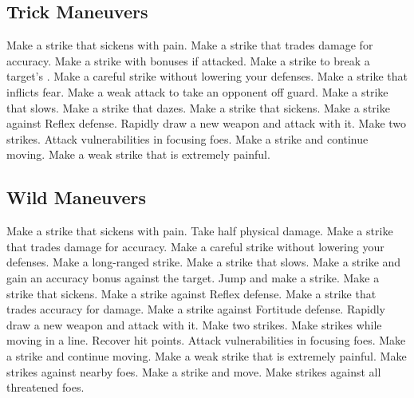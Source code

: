 \subsection{Trick Maneuvers}\label{Trick Maneuvers}
\begin{spelllist}
 Make a strike that sickens with pain.
 Make a strike that trades damage for accuracy.
 Make a strike with bonuses if attacked.
 Make a strike to break a target's .
 Make a careful strike without lowering your defenses.
 Make a strike that inflicts fear.
 Make a weak attack to take an opponent off guard.
 Make a strike that slows.
 Make a strike that dazes.
 Make a strike that sickens.
 Make a strike against Reflex defense.
 Rapidly draw a new weapon and attack with it.
 Make two strikes.
 Attack vulnerabilities in focusing foes.
 Make a strike and continue moving.
 Make a weak strike that is extremely painful.
\end{spelllist}



\small
\subsection{Wild Maneuvers}\label{Wild Maneuvers}
\begin{spelllist}
 Make a strike that sickens with pain.
 Take half physical damage.
 Make a strike that trades damage for accuracy.
 Make a careful strike without lowering your defenses.
 Make a long-ranged strike.
 Make a strike that slows.
 Make a strike and gain an accuracy bonus against the target.
 Jump and make a strike.
 Make a strike that sickens.
 Make a strike against Reflex defense.
 Make a strike that trades accuracy for damage.
 Make a strike against Fortitude defense.
 Rapidly draw a new weapon and attack with it.
 Make two strikes.
 Make strikes while moving in a line.
 Recover hit points.
 Attack vulnerabilities in focusing foes.
 Make a strike and continue moving.
 Make a weak strike that is extremely painful.
 Make strikes against nearby foes.
 Make a strike and move.
 Make strikes against all threatened foes.
\end{spelllist}
